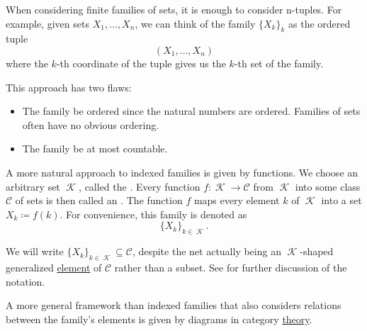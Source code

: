 \begin{definition}\label{def:indexed_family}
  When considering finite families of sets, it is enough to consider n-tuples. For example, given sets \( X_1, \ldots, X_n \), we can think of the family \( \{ X_k \}_k \) as the ordered tuple
  \begin{equation*}
    (X_1, \ldots, X_n)
  \end{equation*}
  where the \( k \)-th coordinate of the tuple gives us the \( k \)-th set of the family.

  This approach has two flaws:
  \begin{itemize}
    \item The family  be ordered since the natural numbers are ordered. Families of sets often have no obvious ordering.
    \item The family  be at most countable.
  \end{itemize}

  A more natural approach to indexed families is given by functions. We choose an arbitrary set \( \mscrK \), called the . Every function \( f: \mscrK \to \mathcal C \) from \( \mscrK \) into some class \( \mathcal C \) of sets is then called an . The function \( f \) maps every element \( k \) of \( \mscrK \) into a set \( X_k \coloneqq f(k) \). For convenience, this family is denoted as
  \begin{equation*}
    \{ X_k \}_{k \in \mscrK}.
  \end{equation*}

  We will write \( \{ X_k \}_{k \in \mscrK} \subseteq \mathcal{C} \), despite the net actually being an \( \mscrK \)-shaped generalized \hyperref[def:generalized_element]{element} of \( \mathcal{C} \) rather than a subset. See  for further discussion of the notation.

  A more general framework than indexed families that also considers relations between the family's elements is given by diagrams in category \hyperref[def:categorical_diagram]{theory}.
\end{definition}

